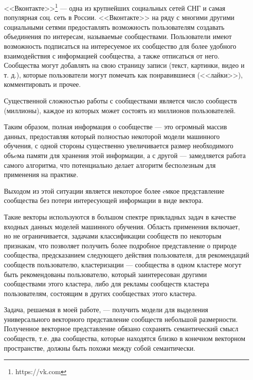 \documentclass[times,specification,annotation]{itmo-student-thesis}
\begin{document}
<<Вконтакте>>\footnote{https://vk.com} --- одна из крупнейших социальных сетей СНГ и самая
популярная соц. сеть в России. <<Вконтакте>> на ряду с многими другими
социальными сетями предоставлять возможность пользователям создавать объединения по интересам,
называемые сообществами. Пользователи имеют возможность подписаться на
интересуемое их сообщество для более удобного взаимодействия с информацией
сообщества, а также отписаться от него. Сообщества могут добавлять на свою
страницу записи (текст, картинки, видео и т. д.), которые пользователи могут
помечать как понравившиеся (<<лайки>>), комментировать и прочее.

Существенной сложностью работы с сообществами является число сообществ (миллионы), каждое из которых может состоять из миллионов пользователей.  

Таким образом, полная информация о сообществе --- это огромный массив
данных, предоставляя который полностью некоторой модели машинного обучения,
с одной стороны существенно увеличивается размер необходимого объeма памяти для хранения этой информации, а с другой --- замедляется работа самого алгоритма, что потенциально делает алгоритм бесполезным для применения на практике.

Выходом из этой ситуации является некоторое более eмкое представление сообщества без потери интересующей информации в виде вектора.

Такие векторы используются в большом спектре прикладных задач в качестве входных данных моделей машинного обучения. Область применения включает, но не ограничивается, задачами классификации сообществ по некоторым признакам, что позволяет получить более подробное представление о природе сообщества, предсказанием следующего действия пользователя, для рекомендаций сообществ пользователю, кластеризации --- сообщества в одном кластере могут быть рекомендованы пользователю, который заинтересован другими сообществами этого кластера, либо для рекламы сообществ кластера пользователям, состоящим в других сообществах этого кластера. 

Задача, решаемая в моей работе, --- получить модели для выделения универсального векторного представление сообществ небольшой размерности. Полученное векторное представление обязано сохранять семантический смысл сообществ, т.е. два сообщества, которые находятся близко в конечном векторном пространстве, должны быть похожи между собой семантически. 

\end{document}

